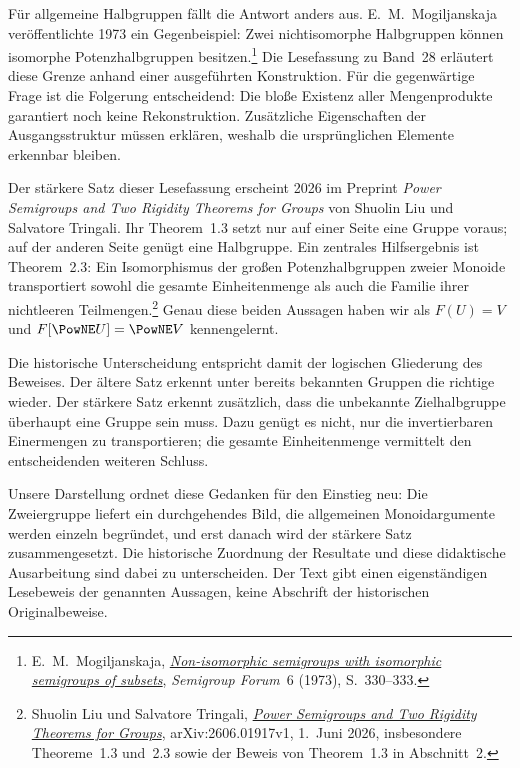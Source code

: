 Für allgemeine Halbgruppen fällt die Antwort anders aus.
E.~M.~Mogiljanskaja veröffentlichte 1973 ein Gegenbeispiel:
Zwei nichtisomorphe Halbgruppen können isomorphe
Potenzhalbgruppen besitzen.\footnote{E.~M.~Mogiljanskaja,
\href{https://doi.org/10.1007/BF02389140}{\emph{Non-isomorphic semigroups with isomorphic semigroups of subsets}},
\emph{Semigroup Forum}~6 (1973), S.~330--333.}
Die Lesefassung zu Band~28 erläutert diese Grenze anhand
einer ausgeführten Konstruktion. Für die gegenwärtige Frage
ist die Folgerung entscheidend: Die bloße Existenz aller
Mengenprodukte garantiert noch keine Rekonstruktion.
Zusätzliche Eigenschaften der Ausgangsstruktur müssen
erklären, weshalb die ursprünglichen Elemente erkennbar
bleiben.

Der stärkere Satz dieser Lesefassung erscheint 2026 im
Preprint \emph{Power Semigroups and Two Rigidity Theorems
for Groups} von Shuolin Liu und Salvatore Tringali.
Ihr Theorem~1.3 setzt nur auf einer Seite eine Gruppe
voraus; auf der anderen Seite genügt eine Halbgruppe.
Ein zentrales Hilfsergebnis ist Theorem~2.3: Ein Isomorphismus
der großen Potenzhalbgruppen zweier Monoide transportiert
sowohl die gesamte Einheitenmenge als auch die Familie
ihrer nichtleeren Teilmengen.\footnote{Shuolin Liu und
Salvatore Tringali,
\href{https://arxiv.org/html/2606.01917v1}{\emph{Power Semigroups and Two Rigidity Theorems for Groups}},
arXiv:2606.01917v1, 1.~Juni 2026, insbesondere Theoreme~1.3
und~2.3 sowie der Beweis von Theorem~1.3 in Abschnitt~2.}
Genau diese beiden Aussagen haben wir als
\(F(U)=V\) und \(F[\PowNE U]=\PowNE V\) kennengelernt.

Die historische Unterscheidung entspricht damit der
logischen Gliederung des Beweises. Der ältere Satz erkennt
unter bereits bekannten Gruppen die richtige wieder.
Der stärkere Satz erkennt zusätzlich, dass die unbekannte
Zielhalbgruppe überhaupt eine Gruppe sein muss. Dazu
genügt es nicht, nur die invertierbaren Einermengen zu
transportieren; die gesamte Einheitenmenge vermittelt
den entscheidenden weiteren Schluss.

Unsere Darstellung ordnet diese Gedanken für den Einstieg
neu: Die Zweiergruppe liefert ein durchgehendes Bild,
die allgemeinen Monoidargumente werden einzeln begründet,
und erst danach wird der stärkere Satz zusammengesetzt.
Die historische Zuordnung der Resultate und diese
didaktische Ausarbeitung sind dabei zu unterscheiden.
Der Text gibt einen eigenständigen Lesebeweis der genannten
Aussagen, keine Abschrift der historischen Originalbeweise.


